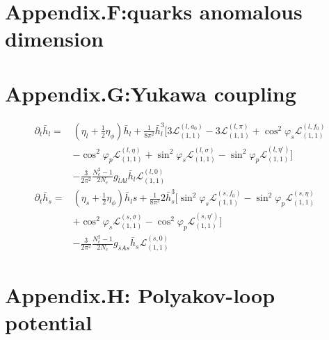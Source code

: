 \documentclass[12pt]{article}
\begin{document}
\section{Appendix.F:quarks anomalous dimension}
\section{Appendix.G:Yukawa coupling}
\begin{align}
\partial_t \bar h_l=&(\eta_l+\frac{1}{2}\eta_{\phi})\bar h_l +\frac{1}{8 \pi^2}\bar h_l^3 \big [ 3\mathcal{L}_{(1,1)}^{(l,a_0)} -3 \mathcal{L}_{(1,1)}^{(l,\pi)}
+\cos^2 \varphi_s \mathcal{L}_{(1,1)}^{(l,f_0)}\nonumber\\
&-\cos^2 \varphi_p \mathcal{L}_{(1,1)}^{(l,\eta)}+\sin^2 \varphi_s \mathcal{L}_{(1,1)}^{(l,\sigma)}-\sin^2 \varphi_p \mathcal{L}_{(1,1)}^{(l,\eta')}\big ]\nonumber\\
&-\frac{3}{2\pi^2} \frac{N_c^2-1}{2N_c}g_{\bar l A l} \bar h_l  \mathcal{L}_{(1,1)}^{(l,0)}\\
\partial_t \bar h_s=&(\eta_s+\frac{1}{2}\eta_{\phi})\bar h_ls+\frac{1}{8 \pi^2} 2 \bar h_s^3 \big [   \sin^2 \varphi_s \mathcal{L}_{(1,1)}^{(s,f_0)} -\sin^2 \varphi_p \mathcal{L}_{(1,1)}^{(s,\eta)} \nonumber\\
&+  \cos^2 \varphi_s \mathcal{L}_{(1,1)}^{(s,\sigma)}-  \cos^2 \varphi_p \mathcal{L}_{(1,1)}^{(s,\eta')}\big]\nonumber\\
&-\frac{3}{2\pi^2} \frac{N_c^2-1}{2N_c}g_{\bar s A s} \bar h_s  \mathcal{L}_{(1,1)}^{(s,0)}
\end{align}
\section{Appendix.H: Polyakov-loop potential}
\end{document}
